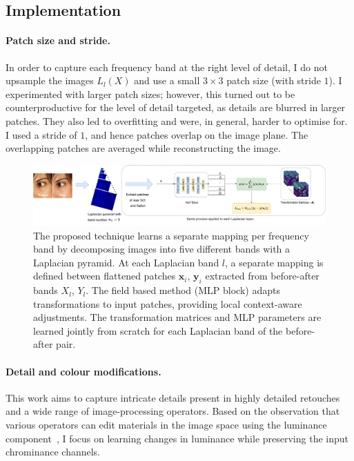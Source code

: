 
\subsection{Implementation}
\label{sec:Implementation}

 \paragraph{Patch size and stride.} In order to capture each frequency band at the right level of detail, I do not upsample the images $L_l(X)$ and use a small $3 \times 3$ patch size (with stride $1$). I experimented with larger patch sizes; however, this turned out to be counterproductive for the level of detail targeted, as details are blurred in larger patches. They also led to overfitting and were, in general, harder to optimise for. I used a stride of $1$, and hence patches overlap on the image plane. The overlapping patches are averaged while reconstructing the image.
 
 \begin{landscape}\centering
\vspace*{\fill}
\begin{figure}[htpb]
  \centering
  \includegraphics[width=1.5\textwidth]{Chapters/detail-retouching-figs/MainFig.pdf}
  \caption{The proposed technique learns a separate mapping per frequency band by decomposing images into five different bands with a Laplacian pyramid. At each Laplacian band $l$, a separate mapping is defined between flattened patches $\mathbf{x}_i$, $\mathbf{y}_i$ extracted from before-after bands $X_l$, $Y_l$. The field based method (MLP block) adapts transformations to input patches, providing local context-aware adjustments. The transformation matrices and MLP parameters are learned jointly from scratch for each Laplacian band of the before-after pair.}
 \label{fig:modelT}

\end{figure}
\vfill
\end{landscape}


\paragraph{Detail and colour modifications.} This work aims to capture intricate details present in highly detailed retouches and a wide range of image-processing operators. Based on the observation that various operators can edit materials in the image space using the luminance component~\cite{Boyadzhiev15Band}, I focus on learning changes in luminance while preserving the input chrominance channels.

